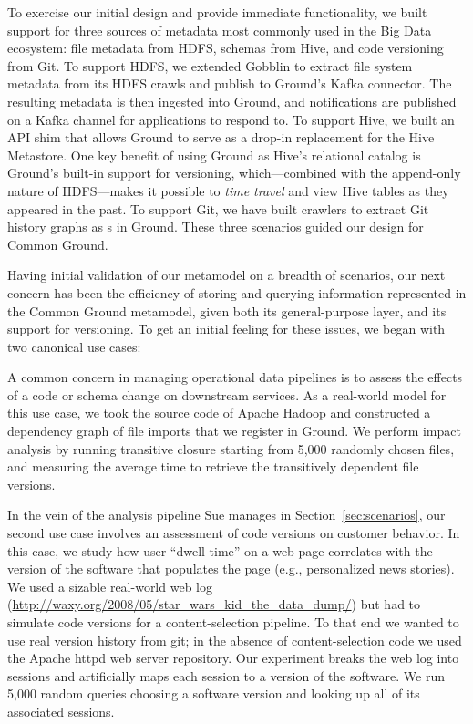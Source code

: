 \documentclass{sig-alternate}
\begin{document}
To exercise our initial design and provide immediate functionality,
we built support for three sources of metadata most commonly used in the Big Data ecosystem: file metadata from HDFS, schemas from Hive, and code versioning from Git.
To support HDFS, we extended Gobblin to extract file system metadata from its HDFS crawls and publish to Ground's Kafka connector. The resulting metadata is then ingested into Ground, and notifications are published on a Kafka channel for applications to respond to. To support Hive, we built an API shim that allows Ground to serve as a drop-in replacement for the Hive Metastore.
One key benefit of using Ground as Hive's relational catalog is Ground's built-in support for versioning, which---combined with the append-only nature of HDFS---makes it possible to \emph{time travel} and view Hive tables as they appeared in the past.  To support Git, we have built crawlers to extract Git history graphs as s in Ground. These three scenarios guided our design for Common Ground.

Having initial validation of our metamodel on a breadth of scenarios, our next concern has been the efficiency of storing and querying information represented in the Common Ground metamodel, given both its general-purpose \modelgraph layer, and its support for versioning. To get an initial feeling for these issues, we began with two canonical use cases:

 A common concern in managing operational data pipelines is to assess the effects of a code or schema change on downstream services.
As a real-world model for this use case, we took the source code of Apache Hadoop and constructed a dependency graph of file imports that we register in Ground.
We perform impact analysis by running transitive closure starting from 5,000 randomly chosen files, and measuring the average time to retrieve the transitively dependent file versions.

 In the vein of the analysis pipeline Sue manages in Section~\ref{sec:scenarios}, our second use case involves an assessment of code versions on customer behavior. 
In this case, we study how user ``dwell time'' on a web page correlates with the version of the software that populates the page (e.g., personalized news stories). 
We used a sizable real-world web log ({\small \url{http://waxy.org/2008/05/star_wars_kid_the_data_dump/}}) %
but had to simulate code versions for a content-selection pipeline. 
To that end we wanted to use real version history from git; in the absence of content-selection code we used the Apache httpd web server repository. 
Our experiment breaks the web log into sessions and artificially maps each session to a version of the software.
We run 5,000 random queries choosing a software version and looking up all of its associated sessions.
\smallitembot
\end{document}
